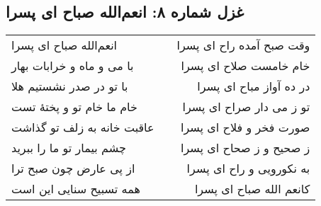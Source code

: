 \begin{center}
\section*{غزل شماره ۸: انعم‌الله صباح ای پسرا}
\label{sec:008}
\begin{longtable}{l p{0.5cm} r}
انعم‌الله صباح ای پسرا
&&
وقت صبح آمده راح ای پسرا
\\
با می و ماه و خرابات بهار
&&
خام خامست صلاح ای پسرا
\\
با تو در صدر نشستیم هلا
&&
در ده آواز مباح ای پسرا
\\
خام ما خام تو و پختهٔ تست
&&
تو ز می دار صراح ای پسرا
\\
عاقبت خانه به زلف تو گذاشت
&&
صورت فخر و فلاح ای پسرا
\\
چشم بیمار تو ما را ببرید
&&
ز صحیح و ز صحاح ای پسرا
\\
از پی عارض چون صبح ترا
&&
به نکورویی و راح ای پسرا
\\
همه تسبیح سنایی این است
&&
کانعم الله صباح ای پسرا
\\
\end{longtable}
\end{center}
